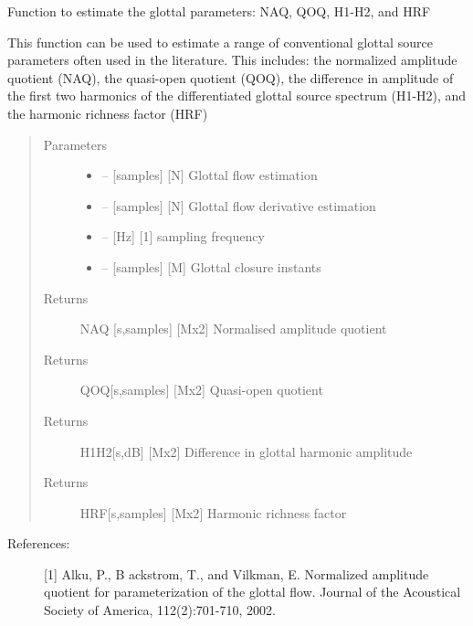 \documentclass[letterpaper,10pt,english]{sphinxmanual}
\begin{document}

\begin{fulllineitems}
\label{\detokenize{Glottal:glottal.get_vq_params}}
Function to estimate the glottal parameters: NAQ, QOQ, H1-H2, and HRF

This function can be used to estimate a range of conventional glottal
source parameters often used in the literature. This includes: the
normalized amplitude quotient (NAQ), the quasi-open quotient (QOQ), the
difference in amplitude of the first two harmonics of the differentiated
glottal source spectrum (H1-H2), and the harmonic richness factor (HRF)
\begin{quote}\begin{description}
\item[{Parameters}] \leavevmode\begin{itemize}
\item {} 
 -- {[}samples{]} {[}N{]} Glottal flow estimation

\item {} 
 -- {[}samples{]} {[}N{]} Glottal flow derivative estimation

\item {} 
 -- {[}Hz{]} {[}1{]} sampling frequency

\item {} 
 -- {[}samples{]} {[}M{]} Glottal closure instants

\end{itemize}

\item[{Returns}] \leavevmode
NAQ {[}s,samples{]} {[}Mx2{]} Normalised amplitude quotient

\item[{Returns}] \leavevmode
QOQ{[}s,samples{]} {[}Mx2{]} Quasi-open quotient

\item[{Returns}] \leavevmode
H1H2{[}s,dB{]} {[}Mx2{]} Difference in glottal harmonic amplitude

\item[{Returns}] \leavevmode
HRF{[}s,samples{]} {[}Mx2{]} Harmonic richness factor

\end{description}\end{quote}
\begin{description}
\item[{References:}] \leavevmode
{[}1{]} Alku, P., B ackstrom, T., and Vilkman, E. Normalized amplitude quotient for parameterization of the glottal flow. Journal of the Acoustical Society of America, 112(2):701-710, 2002.


\end{description}
\end{fulllineitems}
\end{document}
